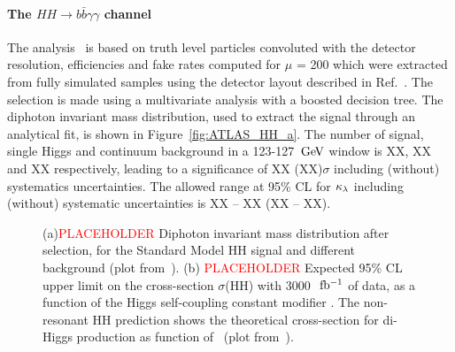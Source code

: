 %
\paragraph{The $HH \rightarrow b\bar{b}\gamma\gamma$ channel}


The analysis~\cite{ATLASHHPUBnote} is based on truth level particles convoluted with the detector resolution, efficiencies and fake rates computed for $\mu$ = 200 which were extracted from fully simulated samples using the detector layout described in Ref.~\cite{ITKPixelTDR}. The selection is made using a multivariate analysis with a boosted decision tree. The diphoton invariant mass distribution, used to extract the signal through an analytical fit, is shown in Figure~\ref{fig:ATLAS_HH_a}. The number of signal, single Higgs and continuum background in a 123-127~$\text{Ge\kern -0.1em V}$ window is XX, XX and XX respectively, leading to a significance of XX (XX)$\sigma$ including (without) systematics uncertainties. The allowed range at 95\% CL for $\kappa_{\lambda}$ including (without) systematic uncertainties is XX -- XX (XX -- XX).


\begin{figure}[!htb]
\centering 
{} 
\caption{(a)\textcolor{red}{PLACEHOLDER} Diphoton invariant mass distribution after selection, for the Standard Model HH signal and different background (plot from~\cite{ITKPixelTDR}). (b) \textcolor{red}{PLACEHOLDER} Expected 95\% CL upper limit on the cross-section $\sigma$(HH) with 3000 $\rm~fb^{-1}$ of data, as a function of the Higgs self-coupling constant modifier \kl. The non-resonant HH prediction shows the theoretical cross-section for di-Higgs production as function of \kl\ (plot from~\cite{ITKPixelTDR}).} 
\label{fig:ATLAS_HH} 
\end{figure}


